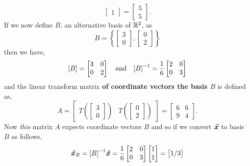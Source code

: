 \documentclass[MathsNotesBase.tex]{subfiles}
\begin{document}
{\begin{exe}
{\[\begin{bmatrix}
				   1
				   \end{bmatrix} =
				   \begin{bmatrix}
				   5\\
				   5
				   \end{bmatrix}.
				\]
				If we now define $B$, an alternative basis of $\mathbb{R}^{2}$, as
				\[ B = \left\{
							\begin{bmatrix}3\\0\end{bmatrix},
							\begin{bmatrix}0\\2\end{bmatrix}
					   \right\}
				\]
				then we have,
				\[
					[B] = 	\begin{bmatrix}
							3 & 0\\
							0 & 2
							\end{bmatrix}
					\hspace{10pt}\text{and}\hspace{10pt}
					{[B]}^{-1} = \frac{1}{6}
								\begin{bmatrix}
								2 & 0\\
								0 & 3
								\end{bmatrix}
				 \]
				and the linear transform matrix \textbf{of coordinate vectors \wrt the basis $B$} is defined as,
				\[ A = \begin{bmatrix}
						T\left(\begin{bmatrix}3 \\ 0\end{bmatrix}\right) & T\left(\begin{bmatrix}0 \\ 2\end{bmatrix}\right)
						\end{bmatrix} =
						\begin{bmatrix}
						6 & 6\\
						9 & 4
						\end{bmatrix}.
				\]
				Now \textit{this} matrix $A$ expects coordinate vectors \wrt $B$ and so if we convert $\vec{\bm{x}}$ to basis $B$ as follows,
				\[ \vec{\bm{x}}_B = {[B]}^{-1}\vec{\bm{x}} = \frac{1}{6}\begin{bmatrix}
													2 & 0\\
													0 & 3
													\end{bmatrix} 
													\begin{bmatrix}
													1\\
													1
													\end{bmatrix} =
													\begin{bmatrix}
													1/3\\

\end{bmatrix}\]}
\end{exe}}
\end{document}
